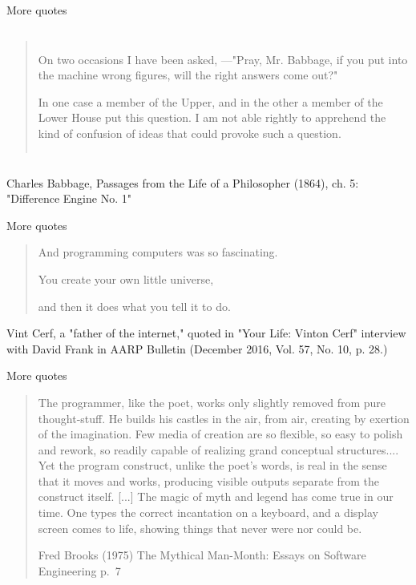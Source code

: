 \documentclass[aspectratio=169,usenames,dvipsnames]{beamer}
\begin{document}
\begin{frame}{More quotes}
    \begin{columns}
    \begin{quote}\normalfont
    On two occasions I have been asked, ---"Pray, Mr. Babbage, if you put
    into the machine wrong figures, will the right answers come out?"

	In one case a member of the Upper, and in the other a member of the Lower
	House put this question. I am not able rightly to apprehend the kind of
	confusion of ideas that could provoke such a question.
	
    \end{quote}
    \end{columns}
	\vspace{1em}
    Charles Babbage, Passages from the Life of a Philosopher (1864), ch. 5:
    "Difference Engine No. 1"
\end{frame}

\begin{frame}{More quotes}
    \begin{quote}\normalfont
    And programming computers was so fascinating.

	You create your own little universe,

	and then it does what you tell it to do.
    \end{quote}

	\vspace{1em}
    Vint Cerf, a "father of the internet," quoted in "Your Life: Vinton Cerf"
    interview with David Frank in AARP Bulletin (December 2016, Vol. 57, No.
    10, p. 28.)
\end{frame}

\begin{frame}{More quotes}
    \begin{quote}\normalfont
    The programmer, like the poet, works only slightly removed from pure
    thought-stuff. He builds his castles in the air, from air, creating by
    exertion of the imagination. Few media of creation are so flexible, so
    easy to polish and rework, so readily capable of realizing grand
    conceptual structures....
    Yet the program construct, unlike the poet's words, is real in the sense
    that it moves and works, producing visible outputs separate from the
    construct itself. [...] The magic of myth and legend has come true in our
    time. One types the correct incantation on a keyboard, and a display
    screen comes to life, showing things that never were nor could be.

	\vspace{1em}
    Fred Brooks (1975) The Mythical Man-Month: Essays on Software Engineering
    p.\ 7
    \end{quote}
\end{frame}
\end{document}
